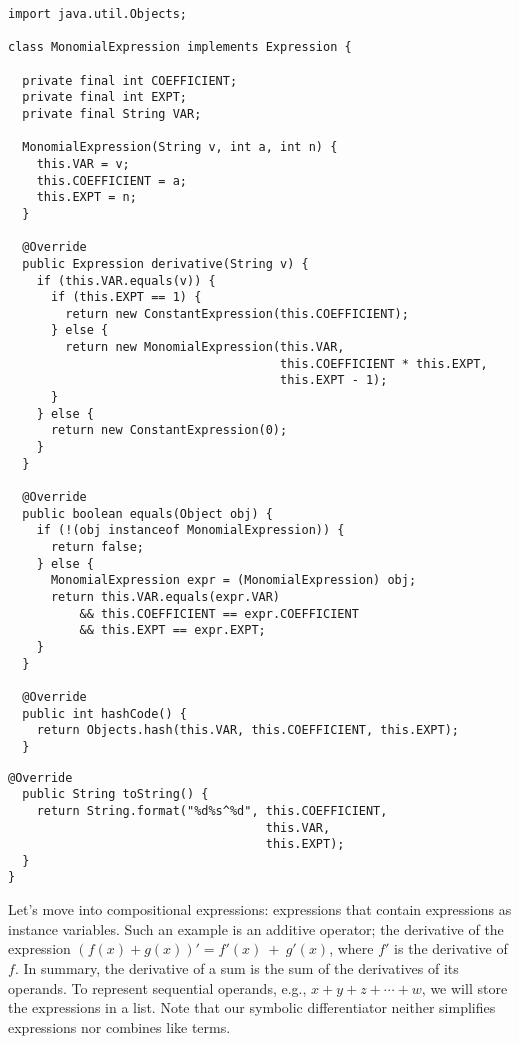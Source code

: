 \begin{lstlisting}[language=MyJavaNF]
import java.util.Objects;

class MonomialExpression implements Expression {

  private final int COEFFICIENT;
  private final int EXPT;
  private final String VAR;

  MonomialExpression(String v, int a, int n) { 
    this.VAR = v;
    this.COEFFICIENT = a;
    this.EXPT = n;
  }

  @Override
  public Expression derivative(String v) { 
    if (this.VAR.equals(v)) {
      if (this.EXPT == 1) {
        return new ConstantExpression(this.COEFFICIENT);
      } else {
        return new MonomialExpression(this.VAR, 
                                      this.COEFFICIENT * this.EXPT, 
                                      this.EXPT - 1);
      }
    } else {
      return new ConstantExpression(0);
    } 
  }

  @Override
  public boolean equals(Object obj) {
    if (!(obj instanceof MonomialExpression)) { 
      return false; 
    } else { 
      MonomialExpression expr = (MonomialExpression) obj;
      return this.VAR.equals(expr.VAR)
          && this.COEFFICIENT == expr.COEFFICIENT 
          && this.EXPT == expr.EXPT;
    }
  }

  @Override
  public int hashCode() { 
    return Objects.hash(this.VAR, this.COEFFICIENT, this.EXPT); 
  }
\end{lstlisting}
\begin{lstlisting}[language=MyJavaNF]
  @Override
  public String toString() { 
    return String.format("%d%s^%d", this.COEFFICIENT, 
                                    this.VAR, 
                                    this.EXPT); 
  }
}
\end{lstlisting}

Let's move into compositional expressions: expressions that contain expressions as instance variables. Such an example is an additive operator; the derivative of the expression $(f(x) + g(x))' = f'(x)~+~g'(x)$, where $f'$ is the derivative of $f$. In summary, the derivative of a sum is the sum of the derivatives of its operands. To represent sequential operands, e.g., $x + y + z + \cdots + w$, we will store the expressions in a list. Note that our symbolic differentiator neither simplifies expressions nor combines like terms.


